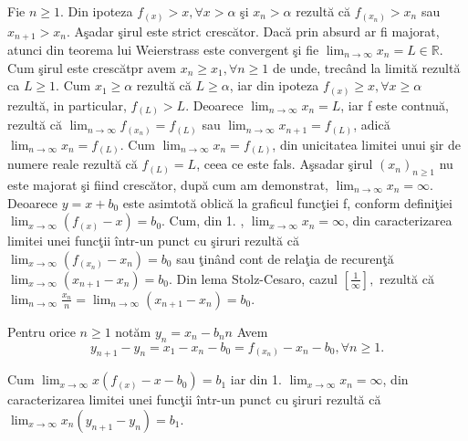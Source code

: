 \documentclass[a4paper,12pt,oneside]{report}
\begin{document}
Fie \(n\geq 1\). Din ipoteza \(f_{\left ( x \right )}> x, \forall x> \alpha\) \c si \(x_{n}> \alpha\) rezult\u a c\u a \(f_{\left ( x_{n} \right )}> x_{n}\) sau \(x_{n+1}> x_{n}\). A\c sadar \c sirul este strict cresc\u ator. Dac\u a prin absurd ar fi majorat, atunci din  teorema lui Weierstrass este convergent \c si fie \(\lim_{n \to \infty }x_{n} = L\in \mathbb{R}\). Cum \c sirul este cresc\u atpr avem \(x_{n}\geq x_{1}, \forall n\geq 1\) de unde, trec\^ and la limit\u a rezult\u a ca \(L \geq 1\). Cum \(x_{1}\geq \alpha\) rezult\u a c\u a \(L\geq \alpha\), iar din ipoteza \(f_{\left ( x \right )}\geq x, \forall x\geq \alpha\) rezult\u a, in particular, \(f_{\left ( L \right )}> L\). Deoarece \(\lim_{n \to \infty }x_{n}= L\), iar f este contnu\u a, rezult\u a c\u a \(\lim_{n \to \infty }f_{\left ( x_{n} \right )} = f_{\left ( L \right )}\) sau \(\lim_{n \to \infty }x_{n+1} = f_{\left ( L \right )}\), adic\u a \(\lim_{n \to \infty }x_{n} = f_{\left ( L \right )}\). Cum \(\lim_{n \to \infty }x_{n} = f_{\left ( L \right )}\), din unicitatea limitei unui \c sir de numere reale rezult\u a c\u a \(f_{\left ( L \right )} = L\), ceea ce este fals. A\c ssadar \c sirul \(\left ( x_{n} \right )_{n\geq 1}\) nu este majorat \c si fiind cresc\u ator, dup\u a cum am demonstrat, \(\lim_{n \to \infty }x_{n}=\infty\). 
Deoarece \(y= x + b_{0}\) este asimtot\u a oblic\u a la graficul func\c tiei f, conform defini\c tiei \(\lim_{x \to \infty }\left ( f_{\left ( x \right )}-x \right )= b_{0}\). Cum, din 1. , \(\lim_{x \to \infty }x_{n} = \infty\), din caracterizarea limitei unei func\c tii \^ intr-un punct cu \c siruri rezult\u a c\u a \(\lim_{x \to \infty }\left ( f_{\left ( x_{n} \right )} -x_{n}\right )= b_{0}\) sau \c tin\^ and cont de rela\c tia de recuren\c t\u a \(\lim_{x \to \infty }\left ( x_{n+1} -x_{n}\right )=b_{0}\). Din lema Stolz-Cesaro, cazul \(\left [ \frac{1}{\infty } \right ],\) rezult\u a c\u a \(\lim_{n \to \infty }\frac{x_{n}}{n}= \lim_{n \to \infty}\left ( x_{n+1} -x_{n}\right ) = b_{0}\).

Pentru orice \(n\geq 1\) not\u am \(y_{n}= x_{n}-b_{n}n\) Avem 
\begin{displaymath}
  y_{n+1}-y_{n}= x_{1}-x_{n}-b_{0} = f_{\left ( x_{n} \right )}-x_{n}-b_{0},\forall n\geq 1.
\end{displaymath}

Cum \(\lim_{x \to \infty }x\left ( f_{\left ( x \right )} -x-b_{0}\right )=b_{1}\) iar din 1. \(\lim_{x \to \infty }x_{n}=\infty\), din caracterizarea limitei unei func\c tii \^ intr-un punct cu \c siruri rezult\u a c\u a \(\lim_{x \to \infty }x_{n}\left ( y_{n+1} -y_{n}\right )=b_{1}\).
\end{document}
